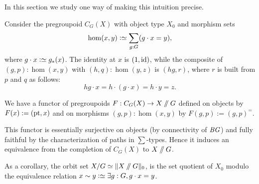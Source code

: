 In this section we study one way of making this intuition precise.

Consider the pregroupoid $C_G(X)$ with object type $X_0$ and morphism sets
\[
  \hom(x,y) \defeq \sum_{g:G}(g\cdot x = y),
\]
where $g\cdot x \defeq g_*(x)$. The identity at $x$ is
$(1,\mathord{\mathrm{id}})$, while the composite of $(g,p):\hom(x,y)$ with
$(h,q):\hom(y,z)$ is $(hg,r)$, where $r$ is built from $p$ and $q$ as
follows:
\[
  hg \cdot x = h\cdot(g\cdot x) = h\cdot y = z.
\]

We have a functor of pregroupoids $F: C_G(X) \to X \mathbin{/\kern-3pt/} G$
defined on objects by
$F(x) := (\mathrm{pt},x)$ and on morphisms $(g,p):\hom(x,y)$ by $F(g,p) :=
(g,p)^=$.

This functor is essentially surjective on objects (by connectivity of
$\mathit{B}\mathit{G}$) and fully faithful by the characterization of paths in
$\sum$-types. Hence it induces an equivalence from the completion of
$C_G(X)$ to $X\mathbin{/\kern-3pt/} G$.

As a corollary, the orbit set $X/G \jdeq \Trunc{X \dblslash G}_0$,
is the set quotient of $X_0$ modulo the equivalence relation
$x \sim y \defeq \exists g:G, g\cdot x = y$.

